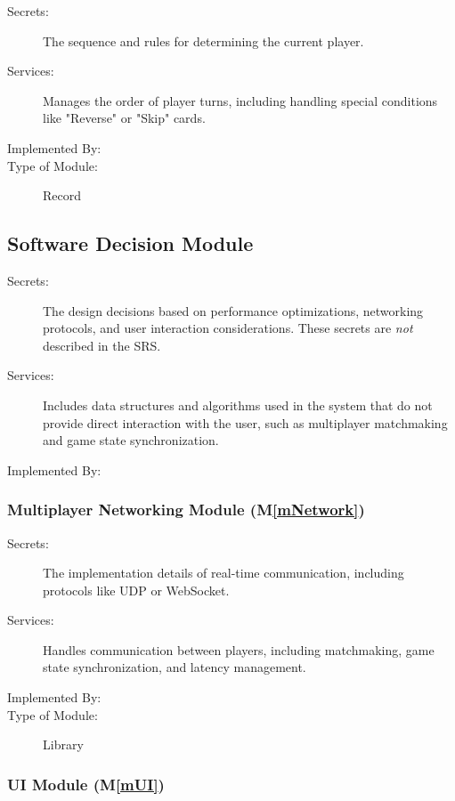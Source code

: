 \documentclass[12pt, titlepage]{article}
\newcommand{\mref}[1]{M\ref{#1}}
\begin{document}
\begin{description}
\item[Secrets:] The sequence and rules for determining the current player.
\item[Services:] Manages the order of player turns, including handling special conditions like "Reverse" or "Skip" cards.
\item[Implemented By:] \progname{}
\item[Type of Module:] Record
\end{description}

\subsection{Software Decision Module}

\begin{description}
\item[Secrets:] The design decisions based on performance optimizations, networking protocols, and user interaction considerations. These secrets are \emph{not} described in the SRS.
\item[Services:] Includes data structures and algorithms used in the system that
  do not provide direct interaction with the user, such as multiplayer matchmaking and game state synchronization.
\item[Implemented By:] \progname{}
\end{description}

\subsubsection{Multiplayer Networking Module (\mref{mNetwork})}

\begin{description}
\item[Secrets:] The implementation details of real-time communication, including protocols like UDP or WebSocket.
\item[Services:] Handles communication between players, including matchmaking, game state synchronization, and latency management.
\item[Implemented By:] \progname{}
\item[Type of Module:] Library
\end{description}

\subsubsection{UI Module (\mref{mUI})}
\end{document}
